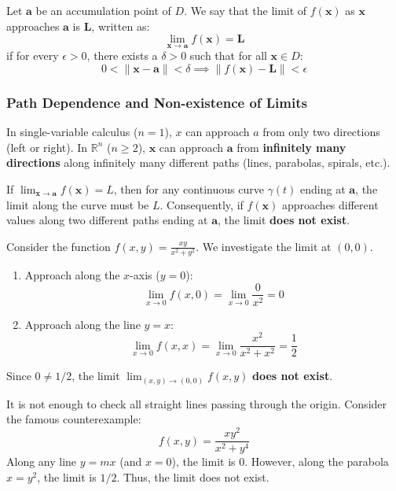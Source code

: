 \begin{definition}[Limit]
Let $\mathbf{a}$ be an accumulation point of $D$. We say that the limit of $f(\mathbf{x})$ as $\mathbf{x}$ approaches $\mathbf{a}$ is $\mathbf{L}$, written as:
\[ \lim_{\mathbf{x} \to \mathbf{a}} f(\mathbf{x}) = \mathbf{L} \]
if for every $\epsilon > 0$, there exists a $\delta > 0$ such that for all $\mathbf{x} \in D$:
\[ 0 < \|\mathbf{x} - \mathbf{a}\| < \delta \implies \|f(\mathbf{x}) - \mathbf{L}\| < \epsilon \]
\end{definition}

\subsubsection{Path Dependence and Non-existence of Limits}

In single-variable calculus ($n=1$), $x$ can approach $a$ from only two directions (left or right). In $\mathbb{R}^n$ ($n \ge 2$), $\mathbf{x}$ can approach $\mathbf{a}$ from \textbf{infinitely many directions} along infinitely many different paths (lines, parabolas, spirals, etc.).

\begin{theorem}
If $\lim_{\mathbf{x} \to \mathbf{a}} f(\mathbf{x}) = L$, then for any continuous curve $\gamma(t)$ ending at $\mathbf{a}$, the limit along the curve must be $L$.
Consequently, if $f(\mathbf{x})$ approaches different values along two different paths ending at $\mathbf{a}$, the limit \textbf{does not exist}.
\end{theorem}

\begin{example}
Consider the function $f(x, y) = \frac{xy}{x^2 + y^2}$. We investigate the limit at $(0,0)$.
\begin{enumerate}
    \item Approach along the $x$-axis ($y=0$):
    \[ \lim_{x \to 0} f(x, 0) = \lim_{x \to 0} \frac{0}{x^2} = 0 \]
    \item Approach along the line $y=x$:
    \[ \lim_{x \to 0} f(x, x) = \lim_{x \to 0} \frac{x^2}{x^2 + x^2} = \frac{1}{2} \]
\end{enumerate}
Since $0 \ne 1/2$, the limit $\lim_{(x,y) \to (0,0)} f(x,y)$ \textbf{does not exist}.
\end{example}

\newpage

\begin{remark}
It is not enough to check all straight lines passing through the origin. Consider the famous counterexample:
\[ f(x, y) = \frac{x y^2}{x^2 + y^4} \]
Along any line $y = mx$ (and $x=0$), the limit is $0$. However, along the parabola $x = y^2$, the limit is $1/2$. Thus, the limit does not exist.
\end{remark}

